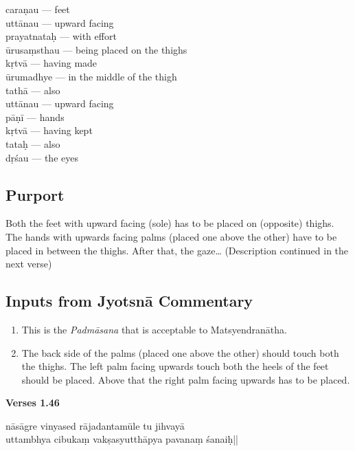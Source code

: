 \begin{multicols}{2}
caraṇau --- feet  \\
uttānau --- upward facing  \\
prayatnataḥ --- with effort  \\
ūrusaṃsthau ---  being placed on the thighs  \\
kṛtvā --- having made  \\
ūrumadhye --- in the middle of the thigh  \\
tathā ---  also  \\
uttānau ---  upward facing  \\
pāṇī ---  hands  \\
kṛtvā ---  having kept  \\
tataḥ ---  also  \\
dṛśau --- the eyes
\end{multicols}

\subsection*{Purport}

Both the feet with upward facing (sole) has to be placed on (opposite) thighs. The hands with upwards facing palms (placed one above the other) have to be placed in between the thighs. After that, the gaze… (Description continued in the next verse)

\subsection*{Inputs from Jyotsnā Commentary}

\begin{enumerate}
\item This is the \textit{Padmāsana} that is acceptable to Matsyendranātha.
\item The back side of the palms (placed one above the other) should touch both the thighs. The left palm facing upwards touch both the heels of the feet should be placed. Above that the right palm facing upwards has to be placed.
\end{enumerate}

\newpage
\noindent \textbf{Verses 1.46}

\begin{shloka}
nāsāgre vinyased rājadantamūle tu jihvayā\\
uttambhya cibukaṃ vakṣasyutthāpya pavanaṃ śanaiḥ||
\end{shloka}

